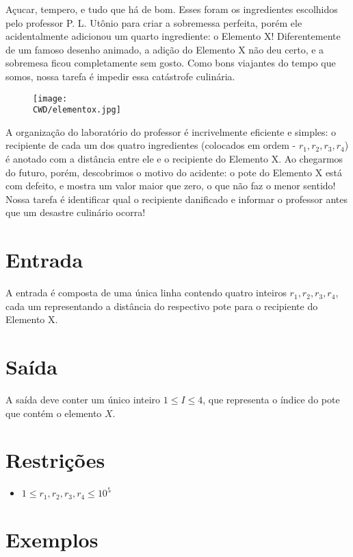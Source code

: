 Açucar, tempero, e tudo que há de bom. Esses foram os ingredientes escolhidos pelo professor P. L. Utônio para criar a sobremessa perfeita,
porém ele acidentalmente adicionou um quarto ingrediente: o Elemento X! Diferentemente de um famoso desenho animado, a adição do Elemento X não deu certo,
e a sobremesa ficou completamente sem gosto. Como bons viajantes do tempo que somos, nossa tarefa é impedir essa catástrofe culinária.

\begin{figure}[H]
    \centering
    \texttt{[image: \\CWD/elementox.jpg]}
\end{figure}

A organização do laboratório do professor é incrivelmente eficiente e simples: o recipiente de cada um dos quatro ingredientes (colocados em ordem - $r_1, r_2, r_3, r_4$)
é anotado com a distância entre ele e o recipiente do Elemento X. Ao chegarmos do futuro, porém, descobrimos o motivo do acidente:
o pote do Elemento X está com defeito, e mostra um valor maior que zero, o que não faz o menor sentido!
Nossa tarefa é identificar qual o recipiente danificado e informar o professor antes que um desastre culinário ocorra!

\section*{Entrada}

A entrada é composta de uma única linha contendo quatro inteiros $r_1, r_2, r_3, r_4$, cada um representando a distância do respectivo pote
para o recipiente do Elemento X.

\section*{Saída}

A saída deve conter um único inteiro $1 \leq I \leq 4$, que representa o índice do pote que contém o elemento $X$.

\section*{Restrições}

\begin{itemize}
\item $ 1 \leq r_1, r_2, r_3, r_4 \leq 10^5$
\end{itemize}

\section*{Exemplos}

\sampleio
